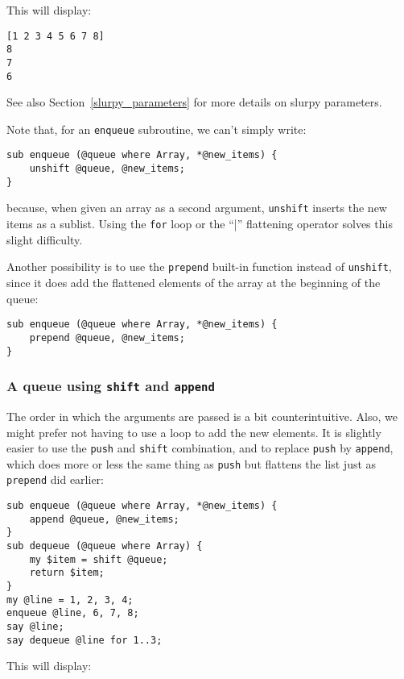 This will display:

\begin{verbatim}
[1 2 3 4 5 6 7 8]
8
7
6
\end{verbatim}

See also Section~\ref{slurpy_parameters} for more details 
on slurpy parameters.

Note that, for an \verb'enqueue' subroutine, we can't 
simply write:
\begin{verbatim}
sub enqueue (@queue where Array, *@new_items) {
    unshift @queue, @new_items;
}
\end{verbatim}
%
because, when given an array as a second argument, 
{\tt unshift} inserts the new items as a sublist. 
Using the \verb'for' loop or the ``|'' flattening operator 
solves this slight difficulty. 

Another possibility is to use the {\tt prepend} built-in 
function instead of {\tt unshift}, since it does add 
the flattened elements of the array at the beginning 
of the queue:

\begin{verbatim}
sub enqueue (@queue where Array, *@new_items) {
    prepend @queue, @new_items;
}
\end{verbatim}

\subsubsection{A queue using {\tt shift} and {\tt append}}

The order in which the arguments are passed is a bit 
counterintuitive. Also, we might prefer not having to use 
a loop to add the new elements. It is slightly easier to use the {\tt push} 
and {\tt shift} combination, and to replace {\tt push} by 
{\tt append}, which does more or less the same thing as 
{\tt push} but flattens the list just as {\tt prepend} 
did earlier:

\begin{verbatim}
sub enqueue (@queue where Array, *@new_items) {
    append @queue, @new_items;
}
sub dequeue (@queue where Array) {
    my $item = shift @queue;
    return $item;
}
my @line = 1, 2, 3, 4;
enqueue @line, 6, 7, 8;
say @line;
say dequeue @line for 1..3;
\end{verbatim}

This will display:

